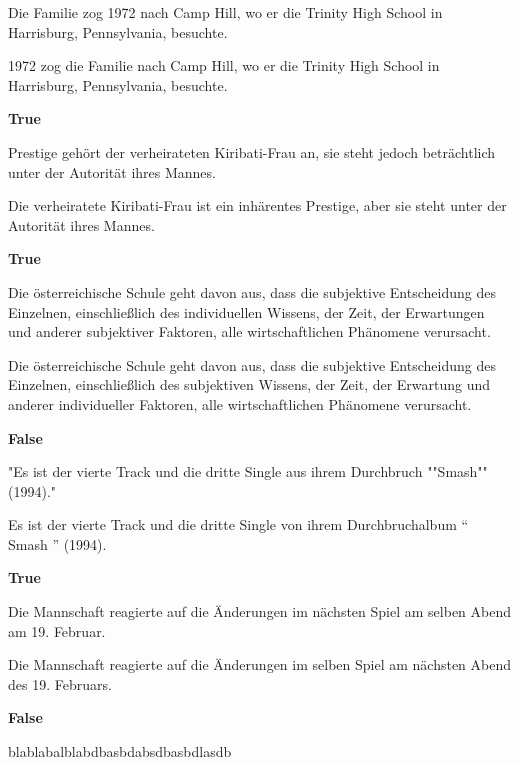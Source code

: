 \begin{examples}
  \label{ex:paws-x}
  \item Die Familie zog 1972 nach Camp Hill, wo er die Trinity High School in Harrisburg, Pennsylvania, besuchte.

  1972 zog die Familie nach Camp Hill, wo er die Trinity High School in Harrisburg, Pennsylvania, besuchte.

  \textbf{True}
  \item Prestige gehört der verheirateten Kiribati-Frau an, sie steht jedoch beträchtlich unter der Autorität ihres Mannes.

  Die verheiratete Kiribati-Frau ist ein inhärentes Prestige, aber sie steht unter der Autorität ihres Mannes.

  \textbf{True}
  \item Die österreichische Schule geht davon aus, dass die subjektive Entscheidung des Einzelnen, einschließlich des individuellen Wissens, der Zeit, der Erwartungen und anderer subjektiver Faktoren, alle wirtschaftlichen Phänomene verursacht.

  Die österreichische Schule geht davon aus, dass die subjektive Entscheidung des Einzelnen, einschließlich des subjektiven Wissens, der Zeit, der Erwartung und anderer individueller Faktoren, alle wirtschaftlichen Phänomene verursacht.

  \textbf{False}
  \item "Es ist der vierte Track und die dritte Single aus ihrem Durchbruch ""Smash"" (1994)."

  Es ist der vierte Track und die dritte Single von ihrem Durchbruchalbum `` Smash '' (1994).

  \textbf{True}
  \item Die Mannschaft reagierte auf die Änderungen im nächsten Spiel am selben Abend am 19. Februar.

  Die Mannschaft reagierte auf die Änderungen im selben Spiel am nächsten Abend des 19. Februars.

  \textbf{False}
\end{examples}



blablabalblabdbasbdabsdbasbdlasdb


